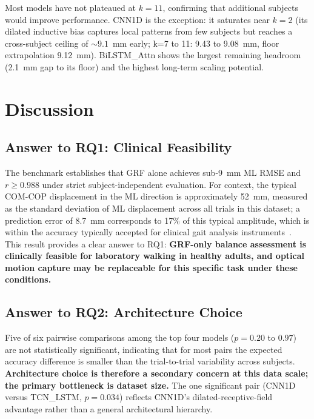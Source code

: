 \documentclass[preprint,12pt]{elsarticle}
\begin{document}
Most models have not plateaued at $k = 11$, confirming that additional subjects
would improve performance.
CNN1D is the exception: it saturates near $k = 2$ (its dilated inductive bias
captures local patterns from few subjects but reaches a cross-subject ceiling of
${\sim}9.1$~mm early; k=7 to 11: 9.43 to 9.08~mm, floor extrapolation 9.12~mm).
BiLSTM\_Attn shows the largest remaining headroom (2.1~mm gap to its floor) and
the highest long-term scaling potential.

\section{Discussion}
\label{sec:discussion}

\subsection{Answer to RQ1: Clinical Feasibility}

The benchmark establishes that GRF alone achieves sub-9~mm ML RMSE and
$r \geq 0.988$ under strict subject-independent evaluation.
For context, the typical COM-COP displacement in the ML direction is
approximately 52~mm, measured as the standard deviation of ML displacement across
all trials in this dataset; a prediction error of 8.7~mm corresponds
to 17\% of this typical amplitude, which is within the accuracy typically accepted
for clinical gait analysis instruments~\cite{s23104933}.
This result provides a clear answer to RQ1: \textbf{GRF-only balance assessment is clinically
feasible for laboratory walking in healthy adults, and optical motion capture may be
replaceable for this specific task under these conditions.}

\subsection{Answer to RQ2: Architecture Choice}
\label{subsec:disc_offline}

Five of six pairwise comparisons among the top four models ($p = 0.20$ to $0.97$)
are not statistically significant, indicating that for most pairs the expected
accuracy difference is smaller than the trial-to-trial variability across subjects.
\textbf{Architecture choice is therefore a secondary concern at this data scale;
the primary bottleneck is dataset size.}
The one significant pair (CNN1D versus TCN\_LSTM, $p = 0.034$) reflects CNN1D's
dilated-receptive-field advantage rather than a general architectural hierarchy.
\end{document}

